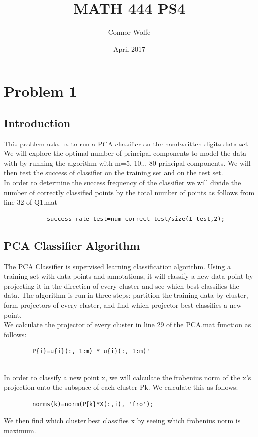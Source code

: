 \documentclass{article}
\title{MATH 444 PS4}
\author{Connor Wolfe}
\date{April 2017}
\begin{document}
\maketitle

\section*{Problem 1}
\subsection*{Introduction}
This problem asks us to run a PCA classifier on the handwritten digits data set.  We will explore the optimal number of principal components to model the data with by running the algorithm with m=5, 10... 80 principal components.  We will then test the success of classifier on the training set and on the test set.  
\\
In order to determine the success frequency of the classifier we will divide the number of correctly classified points by the total number of points as follows from line 32 of Q1.mat
\begin{verbatim}
            success_rate_test=num_correct_test/size(I_test,2);
\end{verbatim}

\subsection*{PCA Classifier Algorithm}
The PCA Classifier is supervised learning classification algorithm.  Using a training set with data points and annotations, it will classify a new data point by projecting it in the direction of every cluster and see which best classifies the data.  The algorithm is run in three steps: partition the training data by cluster, form projectors of every cluster, and find which projector best classifies a new point.
\\We calculate the projector of every cluster in line 29 of the PCA.mat function as follows: 
\begin{verbatim}
        P{i}=u{i}(:, 1:m) * u{i}(:, 1:m)'
\end{verbatim}

\\In order to classify a new point x, we will calculate the frobenius norm of the x's projection onto the subspace of each cluster P{k}.  We calculate this as follows:
\begin{verbatim}
        norms(k)=norm(P{k}*X(:,i), 'fro');
\end{verbatim}
We then find which cluster best classifies x by seeing which frobenius norm is maximum. 
\end{document}
